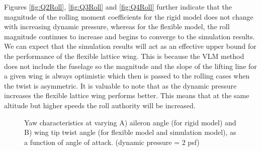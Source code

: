 \documentclass[11pt]{ucthesis}
\begin{document}
Figures \ref{fig:Q2Roll}, \ref{fig:Q3Roll} and \ref{fig:Q4Roll} further indicate that the magnitude of the rolling moment coefficients for the rigid model does not change with increasing dynamic pressure, whereas for the flexible model, the roll magnitude continues to increase and begins to converge to the simulation results. We can expect that the simulation results will act as an effective upper bound for the performance of the flexible lattice wing. This is because the VLM method does not include the fuselage so the magnitude and the slope of the lifting line for a given wing is always optimistic which then is passed to the rolling cases when the twist is asymmetric. It is valuable to note that as the dynamic pressure increases the flexible lattice wing performs better. This means that at the same altitude but higher speeds the roll authority will be increased.

\begin{figure}
\hfill
{}
\hfill
{}
\hfill
\caption{Yaw characteristics at varying A) aileron angle (for rigid model) and B) wing tip twist angle (for flexible model and simulation model), as a function of angle of attack. (dynamic pressure = 2 psf)}
\label{fig:Q2Yaw}
\end{figure}
\end{document}
